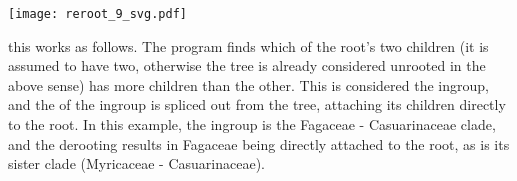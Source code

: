
\begin{center}
\texttt{[image: reroot\_9\_svg.pdf]}
\end{center}

\noindent{}this works as follows. The program finds which of the root's two
children (it is assumed to have two, otherwise the tree is already considered
unrooted in the above sense) has more children than the other. This is
considered the ingroup, and the \lca{} of the ingroup is spliced out from the
tree, attaching its children directly to the root. In this example, the ingroup
is the Fagaceae - Casuarinaceae clade, and the derooting results in Fagaceae
being directly attached to the root, as is its sister clade (Myricaceae -
Casuarinaceae).
